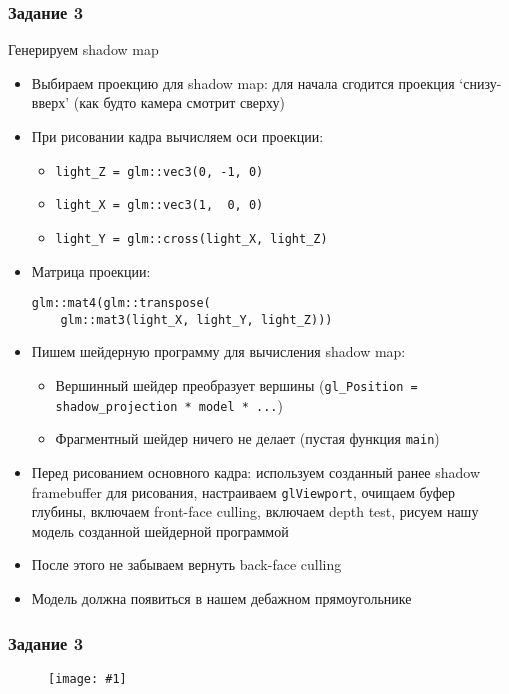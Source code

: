 \documentclass{beamer}
\newcommand{\slideimage}[1]{
  \begin{figure}
    \begin{adjustbox}{width=\textwidth, totalheight=\textheight-2\baselineskip-2\baselineskip,keepaspectratio}
      \texttt{[image: \#1]}
    \end{adjustbox}
  \end{figure}
}
\begin{document}
\begin{frame}[fragile]
\frametitle{Задание 3}
\fontsize{10pt}{10pt}
Генерируем shadow map
\begin{itemize}
\item Выбираем проекцию для shadow map: для начала сгодится проекция `снизу-вверх' (как будто камера смотрит сверху)
\item При рисовании кадра вычисляем оси проекции:
\begin{itemize}
\item \verb|light_Z = glm::vec3(0, -1, 0)|
\item \verb|light_X = glm::vec3(1,  0, 0)|
\item \verb|light_Y = glm::cross(light_X, light_Z)|
\end{itemize}
\item Матрица проекции: \begin{verbatim}glm::mat4(glm::transpose(
    glm::mat3(light_X, light_Y, light_Z)))\end{verbatim}
\item Пишем шейдерную программу для вычисления shadow map:
\begin{itemize}
\item Вершинный шейдер преобразует вершины (\verb|gl_Position = shadow_projection * model * ...|)
\item Фрагментный шейдер ничего не делает (пустая функция \verb|main|)
\end{itemize}
\item Перед рисованием основного кадра: используем созданный ранее shadow framebuffer для рисования, настраиваем \verb|glViewport|, очищаем буфер глубины, включаем front-face culling, включаем depth test, рисуем нашу модель созданной шейдерной программой
\item После этого не забываем вернуть back-face culling
\item Модель должна появиться в нашем дебажном прямоугольнике
\end{itemize}
\end{frame}

\begin{frame}[fragile]
\frametitle{Задание 3}
\slideimage{3.png}
\end{frame}
\end{document}

